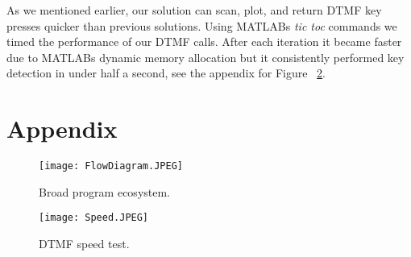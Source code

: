 %
%
\vspace{1cm}
As we mentioned earlier, our solution can scan, plot, and return DTMF key presses quicker than previous solutions. Using MATLABs \textit{tic toc} commands we timed the performance of our DTMF calls. After each iteration it became faster due to MATLABs dynamic memory allocation but it consistently performed key detection in under half a second, see the appendix for Figure ~\ref{Speed}.


%
%

\clearpage
\section{Appendix}

\begin{figure}[h!]
	\begin{center}
		\texttt{[image: FlowDiagram.JPEG]}
	\end{center}
	\vspace{-1em}
	\caption{Broad program ecosystem.}
	\label{FlowDiagram}
\end{figure}

\begin{figure}[h!]
	\begin{center}
		\texttt{[image: Speed.JPEG]}
	\end{center}
	\vspace{-1em}
	\caption{DTMF speed test.}
	\label{Speed}
\end{figure}





